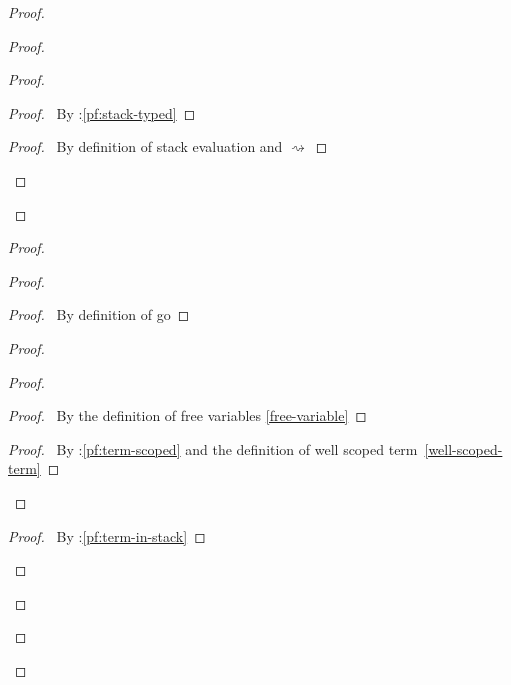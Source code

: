 \documentclass[a4paper]{article}
\begin{document}
\begin{proof}
\begin{proof}
\begin{proof}
      \begin{proof}
        \pf\ By \toplevel:\ref{pf:stack-typed}
      \end{proof}
      \begin{proof}
        \pf\ By definition of stack evaluation and $\rightsquigarrow$
      \end{proof}
    \end{proof}
  \end{proof}
  \begin{proof}
    \begin{proof}
      \begin{proof}
        \pf\ By definition of \textsf{go}
      \end{proof}
      \begin{proof}
        \begin{proof}
          \begin{proof}
            \pf\ By the definition of free variables \ref{free-variable}
          \end{proof}
          \qedstep
          \begin{proof}
            \pf\ By \toplevel:\ref{pf:term-scoped} and the definition of well scoped term~\ref{well-scoped-term}
          \end{proof}
        \end{proof}
        \begin{proof}
          \pf\ By \toplevel:\ref{pf:term-in-stack}
        \end{proof}

\end{proof}
\end{proof}
\end{proof}
\end{proof}
\end{document}
